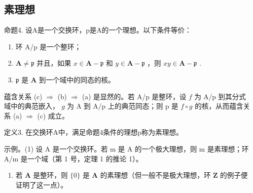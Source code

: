 \subsection{素理想}

命题4. 设A是一个交换环，p是A的一个理想。以下条件等价：

\begin{enumerate}
\def\labelenumi{(\alph{enumi})}
\item
  环 A/p 是一个整环；
\item
  \(\mathbf{A} \neq \mathfrak{p}\) 并且，如果 \(x \in \mathbf{A} - \mathfrak{p}\) 和 \(y \in \mathbf{A} - \mathfrak{p}\) ，则 \(xy \in \mathbf{A} - \mathfrak{p}\) .
\item
  \(\mathfrak{p}\) 是 \(\mathbf{A}\) 到一个域中的同态的核。
\end{enumerate}

蕴含关系 (c) \(\Rightarrow\) (b) \(\Rightarrow\) (a) 是显然的。若 A/p 是整环，设 \(f\) 为 A/p 到其分式域中的典范嵌入， \(g\) 为 A 到 A/p 上的典范同态；则 p 是 \(f \circ g\) 的核，从而蕴含关系 (a) \(\Rightarrow\) (c) 成立。

定义3. 在交换环A中，满足命题4条件的理想p称为素理想。

示例。(1) 设 A 是一个交换环。若 m 是 A 的一个极大理想，则 m 是素理想；环 A/m 是一个域（第 1 号，定理 1 的推论 1）。

\begin{enumerate}
\def\labelenumi{(\arabic{enumi})}
\setcounter{enumi}{1}
\tightlist
\item
  若 \(\mathbf{A}\) 是整环，则 \(\{0\}\) 是 \(\mathbf{A}\) 的素理想（但一般不是极大理想，环 \(\mathbf{Z}\) 的例子便证明了这一点）。
\end{enumerate}

